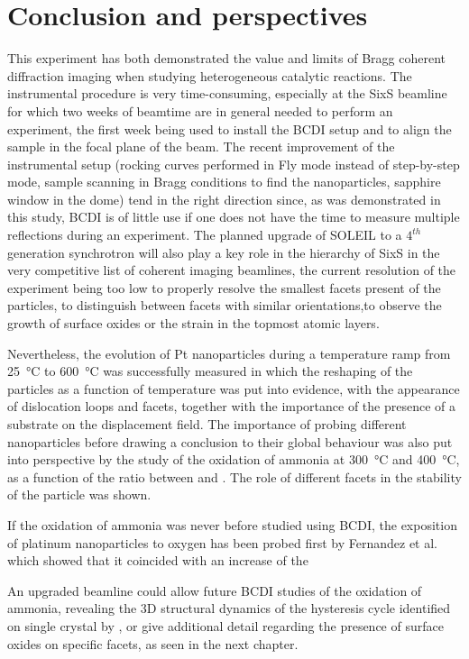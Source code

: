 \section{Conclusion and perspectives}

This experiment has both demonstrated the value and limits of Bragg coherent diffraction imaging when studying heterogeneous catalytic reactions.
The instrumental procedure is very time-consuming, especially at the SixS beamline for which two weeks of beamtime are in general needed to perform an experiment, the first week being used to install the BCDI setup and to align the sample in the focal plane of the beam.
The recent improvement of the instrumental setup (rocking curves performed in Fly mode instead of step-by-step mode, sample scanning in Bragg conditions to find the nanoparticles, sapphire window in the dome) tend in the right direction since, as was demonstrated in this study, BCDI is of little use if one does not have the time to measure multiple reflections during an experiment.
The planned upgrade of SOLEIL to a $4^{th}$ generation synchrotron will also play a key role in the hierarchy of SixS in the very competitive list of coherent imaging beamlines, the current resolution of the experiment being too low to properly resolve the smallest facets present of the particles, to distinguish between facets with similar orientations,to observe the growth of surface oxides or the strain in the topmost atomic layers.

Nevertheless, the evolution of Pt nanoparticles during a temperature ramp from \qty{25}{\degreeCelsius} to \qty{600}{\degreeCelsius} was successfully measured in which the reshaping of the particles as a function of temperature was put into evidence, with the appearance of dislocation loops and facets, together with the importance of the presence of a substrate on the displacement field.
The importance of probing different nanoparticles before drawing a conclusion to their global behaviour was also put into perspective by the study of the oxidation of ammonia at \qty{300}{\degreeCelsius} and \qty{400}{\degreeCelsius}, as a function of the ratio between  and \ammonia.
The role of different facets in the stability of the particle was shown.

If the oxidation of ammonia was never before studied using BCDI, the exposition of platinum nanoparticles to oxygen has been probed first by Fernandez et al. \cite*{Fernandez2019} which showed that it coincided with an increase of the

An upgraded beamline could allow future BCDI studies of the oxidation of ammonia, revealing the 3D structural dynamics of the hysteresis cycle identified on single crystal by \cite{Resta2020a}, or give additional detail regarding the presence of surface oxides on specific facets, as seen in the next chapter.
